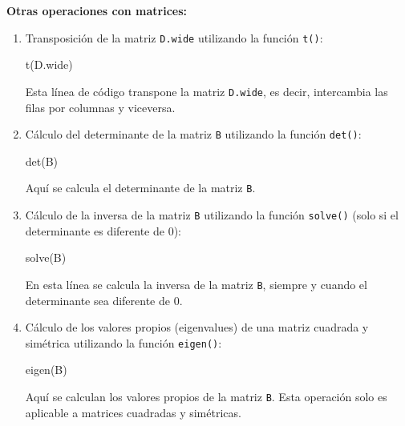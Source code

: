 \documentclass[
  letterpaper,
  DIV=11,
  numbers=noendperiod]{scrartcl}
\newenvironment{Shaded}{}{}
\newcommand{\FunctionTok}[1]{\textcolor[rgb]{0.44,0.26,0.76}{#1}}
\newcommand{\NormalTok}[1]{\textcolor[rgb]{0.14,0.16,0.18}{#1}}
\begin{document}
\textbf{Otras operaciones con matrices:}

\begin{enumerate}
\def\labelenumi{\arabic{enumi}.}
\item
  Transposición de la matriz \texttt{D.wide} utilizando la función
  \texttt{t()}:

\begin{Shaded}
\begin{Highlighting}[]
\FunctionTok{t}\NormalTok{(D.wide)}
\end{Highlighting}
\end{Shaded}

  Esta línea de código transpone la matriz \texttt{D.wide}, es decir,
  intercambia las filas por columnas y viceversa.
\item
  Cálculo del determinante de la matriz \texttt{B} utilizando la función
  \texttt{det()}:

\begin{Shaded}
\begin{Highlighting}[]
\FunctionTok{det}\NormalTok{(B)}
\end{Highlighting}
\end{Shaded}

  Aquí se calcula el determinante de la matriz \texttt{B}.
\item
  Cálculo de la inversa de la matriz \texttt{B} utilizando la función
  \texttt{solve()} (solo si el determinante es diferente de 0):

\begin{Shaded}
\begin{Highlighting}[]
\FunctionTok{solve}\NormalTok{(B)}
\end{Highlighting}
\end{Shaded}

  En esta línea se calcula la inversa de la matriz \texttt{B}, siempre y
  cuando el determinante sea diferente de 0.
\item
  Cálculo de los valores propios (eigenvalues) de una matriz cuadrada y
  simétrica utilizando la función \texttt{eigen()}:

\begin{Shaded}
\begin{Highlighting}[]
\FunctionTok{eigen}\NormalTok{(B)}
\end{Highlighting}
\end{Shaded}

  Aquí se calculan los valores propios de la matriz \texttt{B}. Esta
  operación solo es aplicable a matrices cuadradas y simétricas.
\end{enumerate}
\end{document}
